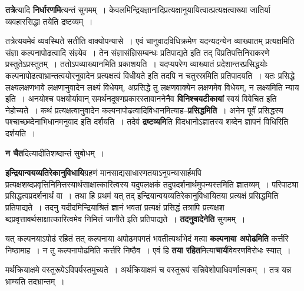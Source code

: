 \documentclass[article,12pt,a4paper]{memoir}
\begin{document}
	  \pstart \textbf{तत्रे}त्यादि \textbf{निर्धारणमि}त्यन्तं सुगमम् । केवलमिन्द्रियज्ञानादिप्रत्यक्षानुयायित्वात्प्रत्यक्षत्वाख्या जातिर्या व्यवहारसिद्धा तयेति द्रष्टव्यम् ।
	\pend
      

	  \pstart तत्रेत्ययमेवं व्यवस्थिते सतीति वाक्योपन्यासे । एवं चानुवादविधिक्रमेण यदन्यदन्येन व्याख्यातम् प्रत्यक्षमिति संज्ञा कल्पनापोढत्वादि संज्ञ्येव । तेन संज्ञासंज्ञिसम्बन्धः प्रतिपाद्यते  इति तद् विप्रतिपत्तिनिराकरणे प्रस्तुतेऽप्रस्तुतम् । ततोऽपव्याख्यानमिति प्रकाशयति । यदप्यपरेण व्याख्यातं प्रदेशान्तरप्रसिद्धयोः कल्पनापोढत्वाभ्रान्तत्वयोरनुवादेन प्रत्यक्षत्वं विधीयते  इति तदपि न चतुरस्रमिति प्रतिपादयति । यतः प्रसिद्धे लक्ष्यलक्षणभावे लक्षणानुवादेन लक्ष्यं विधेयम्, अप्रसिद्धे तु लक्षणवाक्येन लक्षणमेव विधेयम्, न लक्ष्यमिति न्याय इति । अनयोश्च पक्षयोर्यावान् समर्थनदूषणप्रकारस्तावाननेनैव \textbf{विनिश्चयटीकायां} स्वयं विवेचित इति नेहोच्यते । कथं प्रत्यक्षत्वानुवादेन कल्पनापोढत्वादिविधानमित्याह--\textbf{प्रसिद्धमिति} । अनेन पूर्वं प्रसिद्धस्य पश्चाच्छब्देनाभिधानमनुवाद इति दर्शयति । तदेवं \textbf{द्रष्टव्यमि}ति विदधानोऽज्ञातस्य शब्देन ज्ञापनं विधिरिति दर्शयति ।
	\pend
      

	  \pstart \textbf{न चैत}दित्यादीतिशब्दान्तं सुबोधम् ।
	\pend
      

	  \pstart \textbf{इन्द्रियान्वयव्यतिरेकानुविधायि}ग्रहणं मानसाद्यसाधारणतयाऽनुपन्यासार्हमपि प्रत्यक्षशब्दप्रवृत्तिनिमित्तस्यार्थसाक्षात्कारित्वस्य यदुपलक्षकं तदुपदर्शनार्थमुपन्यस्तमिति ज्ञातव्यम् । परिपाट्या प्रसिद्धत्वप्रदर्शनार्थं वा । तथा हि प्रथमं यत् तद् इन्द्रियान्वयव्यतिरेकानुविधायितया प्रत्यक्षं प्रसिद्धमिति प्रतिपाद्यते । तदनु यदीदमिन्द्रियाश्रितं ज्ञानं भवतां प्रत्यक्षं प्रसिद्धं तत्रापि प्रत्यक्षश \leavevmode{}ब्दप्रवृत्तावर्थसाक्षात्कारित्वमेव निमित्तं जानीते इति प्रतिपाद्यते । \textbf{तदनुवादेनेति} सुगमम् ।
	\pend
      

	  \pstart यत् कल्पनयाऽपोढं रहितं तत् कल्पनाया अपोढमपगतं भवतीत्यर्थाभेदं मत्वा \textbf{कल्पनाया अपोढमिति} कर्त्तरि निष्ठामाह । न तु कल्पनापोढमिति कर्त्तरि निष्ठैव । एवं हि \textbf{तया रहित}मित्या\textbf{चार्य}विवरणविरोधः स्यात् ।
	\pend
	  \bigskip
	  \begingroup
	

	  \pstart मर्थक्रियाक्षमे वस्तुरूपेऽविपर्यस्तमुच्यते । अर्थक्रियाक्षमं च वस्तुरूपं सन्निवेशोपाधिवर्णात्मकम् । तत्र यन्न भ्राम्यति तदभ्रान्तम् ।
	\pend
      
\end{document}
